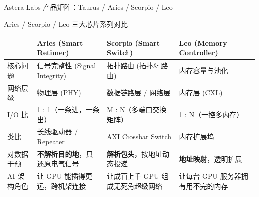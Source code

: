 \documentclass[aspectratio=169, 8pt, UTF8]{ctexbeamer}
\begin{document}
\begin{frame}{Astera Labs 产品矩阵：Taurus / Aries / Scorpio / Leo}
  \begin{block}{Aries / Scorpio / Leo 三大芯片系列对比}
    \vspace{2pt}
    \centering
    \begin{tabularx}{\textwidth}{p{2.6cm} p{3.8cm} p{3.8cm} p{3.8cm}}
      \toprule
      & \textbf{Aries (Smart Retimer)} & \textbf{Scorpio (Smart Switch)} & \textbf{Leo (Memory Controller)} \\
      \midrule
      核心问题
        & 信号完整性 (Signal Integrity)
        & 拓扑路由 (拓扑\& 路由)
        & 内存容量与池化 \\
      \addlinespace
      网络层级
        & 物理层 (PHY)
        & 数据链路层 / 网络层
        & 内存层 (CXL) \\
      \addlinespace
      I/O 比
        & 1 : 1（一条进，一条出）
        & M : N（多端口交换矩阵）
        & 1 : N（一控多内存）\\
      \addlinespace
      类比
        & 长线驱动器 / Repeater
        & AXI Crossbar Switch
        & 内存扩展坞 \\
      \addlinespace
      对数据干预
        & \textbf{不解析目的地}，只还原电气信号
        & \textbf{解析包头}，按地址动态投递
        & \textbf{地址映射}，透明扩展 \\
      \addlinespace
      AI 架构角色
        & 让 GPU 能插得更远，跨机架连接
        & 让成百上千 GPU 组成无死角超级网络
        & 让每台 GPU 服务器拥有用不完的内存 \\
      \bottomrule
    \end{tabularx}
  \end{block}
\end{frame}
\end{document}
